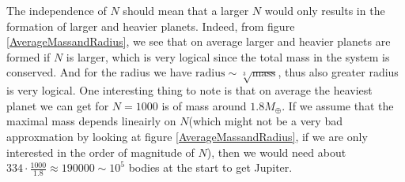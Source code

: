 The independence of $N$ should mean that a larger $N$ would only results in the formation of larger and heavier planets. Indeed, from figure \ref{AverageMassandRadius}, we see that on average larger and heavier planets are formed if $N$ is larger, which is very logical since the total mass in the system is conserved. And for the radius we have $\text{radius} \sim \sqrt[3]{\text{mass}}$, thus also greater radius is very logical. One interesting thing to note is that on average the heaviest planet we can get for $N=1000$ is of mass around $1.8M_{\oplus}$. If we assume that the maximal mass depends lineairly on $N$(which might not be a very bad approxmation by looking at figure \ref{AverageMassandRadius}, if we are only interested in the order of magnitude of $N$), then we would need about $334\cdot \frac{1000}{1.8}\approx 190000\sim 10^5$ bodies at the start to get Jupiter. 